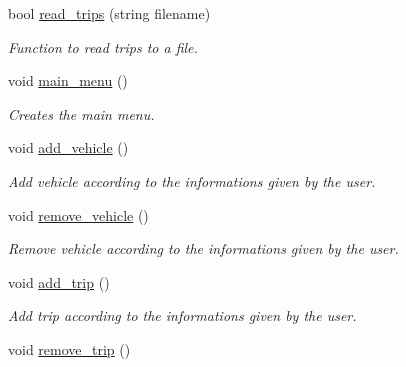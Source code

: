 \begin{DoxyCompactItemize}
bool \mbox{\hyperlink{class_management_a84634ca51dce29ab60e964128302cc4c}{read\+\_\+trips}} (string filename)
\begin{DoxyCompactList}\small\item\em Function to read trips to a file. \end{DoxyCompactList}\item 
\mbox{\label{class_management_aeb489fc5dcd2a306c45c4de6261a1f69}} 
void \mbox{\hyperlink{class_management_aeb489fc5dcd2a306c45c4de6261a1f69}{main\+\_\+menu}} ()
\begin{DoxyCompactList}\small\item\em Creates the main menu. \end{DoxyCompactList}\item 
\mbox{\label{class_management_ad20f9e2096c9550286ef65c30b60580c}} 
void \mbox{\hyperlink{class_management_ad20f9e2096c9550286ef65c30b60580c}{add\+\_\+vehicle}} ()
\begin{DoxyCompactList}\small\item\em Add vehicle according to the informations given by the user. \end{DoxyCompactList}\item 
\mbox{\label{class_management_ac84fc5b65c91433d3dd8fd7c674fa491}} 
void \mbox{\hyperlink{class_management_ac84fc5b65c91433d3dd8fd7c674fa491}{remove\+\_\+vehicle}} ()
\begin{DoxyCompactList}\small\item\em Remove vehicle according to the informations given by the user. \end{DoxyCompactList}\item 
\mbox{\label{class_management_a4f9bfe1bac2eeb7b8364e61bfa4811fd}} 
void \mbox{\hyperlink{class_management_a4f9bfe1bac2eeb7b8364e61bfa4811fd}{add\+\_\+trip}} ()
\begin{DoxyCompactList}\small\item\em Add trip according to the informations given by the user. \end{DoxyCompactList}\item 
\mbox{\label{class_management_a0ab4dc585ee4d3f2463ccca2b97f9201}} 
void \mbox{\hyperlink{class_management_a0ab4dc585ee4d3f2463ccca2b97f9201}{remove\+\_\+trip}} ()

\end{DoxyCompactItemize}
